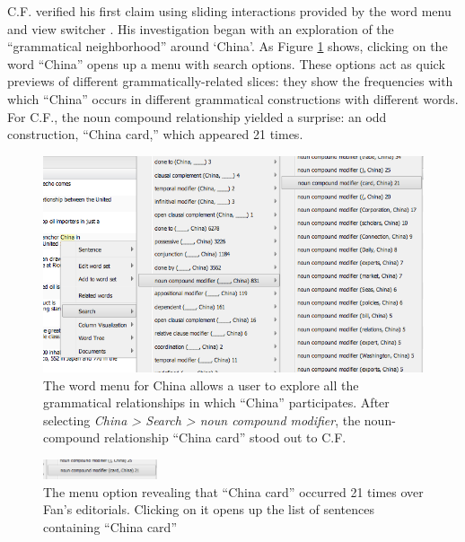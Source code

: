 \documentclass{sig-alternate}
\begin{document}
C.F. verified his first claim using sliding interactions provided by the word menu and view switcher . His investigation began with an exploration of the ``grammatical neighborhood'' around `China'. As Figure \ref{fig:chris01} shows, clicking on the word ``China'' opens up a menu with search options. These options act as quick previews of different grammatically-related slices: they show the frequencies with which ``China'' occurs in different grammatical constructions with different words.  For C.F., the noun compound relationship yielded a surprise: an odd construction, ``China card,'' which appeared 21 times.


\begin{figure}[h!]
\includegraphics[width=\textwidth]{fig/chris/01.png}
\caption{The word menu for China allows a user to explore all the grammatical relationships in which ``China'' participates.   After selecting \emph{China > Search > noun compound modifier}, the noun-compound relationship ``China card'' stood out to C.F. \label{fig:chris01}}
\end{figure}

\begin{figure}[h!]
\includegraphics[width=0.3\textwidth]{fig/chris/01b.png}
\caption{ The menu option revealing that ``China card'' occurred 21 times over Fan's editorials. Clicking on it opens up the list of sentences containing ``China card''  \label{fig:chris01b}}
\end{figure}
\end{document}
